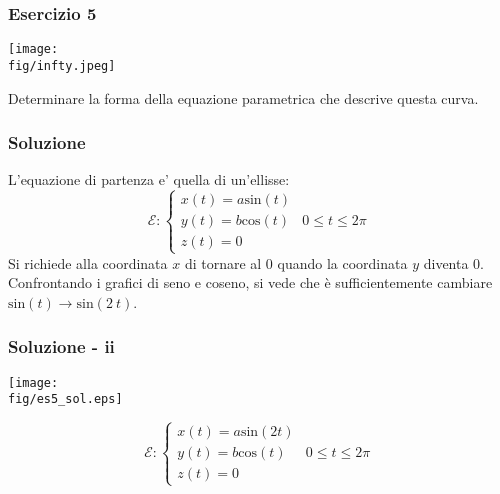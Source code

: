 \documentclass{beamer}
\newcommand{\fig}{figures} %
\newcommand{\msin}{\mbox{sin}} %
\newcommand{\mcos}{\mbox{cos}} %
\begin{document}
\begin{frame}
\frametitle{Esercizio 5}

\texttt{[image: \\fig/infty.jpeg]}

Determinare la forma della equazione parametrica che descrive questa curva. 
\end{frame}
\begin{frame}
\frametitle{Soluzione}
L'equazione di partenza e' quella di un'ellisse:
\begin{displaymath}
\mathcal{E}:\begin{cases}
 x(t)=  a \msin(t)\\
 y(t)=  b \mcos(t) & 0\leq t \leq 2\pi\\
 z(t)= 0
\end{cases}
\end{displaymath}
Si richiede alla coordinata $x$ di tornare al 0 quando la coordinata $y$
diventa 0. Confrontando i grafici di seno e coseno, si vede che \`e
sufficientemente cambiare $\msin(t)\rightarrow \msin(2~t)$.
\end{frame}
\begin{frame}
\frametitle{Soluzione - ii}
\begin{center}
\texttt{[image: \\fig/es5\_sol.eps]}
\end{center}

\begin{displaymath}
\mathcal{E}:\begin{cases}
 x(t)=  a \msin(2t)\\
 y(t)=  b \mcos(t) & 0\leq t \leq 2\pi\\
 z(t)= 0
\end{cases}
\end{displaymath}
\end{frame}
\end{document}
